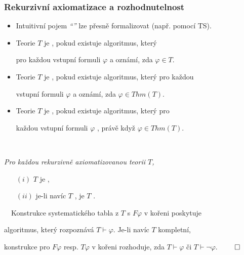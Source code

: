 \subsubsection*{Rekurzivní axiomatizace a rozhodnutelnost}
    \begin{itemize}
    \item Intuitivní pojem \emph{``''} lze přesně formalizovat (např. pomocí TS).
    \smallskip
    
    \item Teorie $T$ je , pokud existuje algoritmus, který
    \smallskip
    
    pro každou vstupní formuli $\varphi$  a oznámí, zda $\varphi \in T$.
    \smallskip
    
    \item Teorie $T$ je , pokud existuje algoritmus, který pro každou
    \smallskip
    
    vstupní formuli $\varphi$  a oznámí, zda $\varphi \in Thm(T)$.
    \smallskip
    
    \item Teorie $T$ je , pokud existuje algoritmus, který pro
    \smallskip
    
    každou vstupní formuli $\varphi$ , právě když $\varphi \in Thm(T)$.
    \end{itemize}
    \smallskip
    
    {\bf {}}\ \ {\it Pro každou rekurzivně axiomatizovanou teorii $T$,

    \begin{enumerate}
    \item [$(i)$] $T$ je ,
    \smallskip
    
    \item [$(ii)$] je-li navíc $T$ , je $T$ .
    \end{enumerate}}
    \smallskip
    
    {\it {}}\ \ Konstrukce systematického tabla z $T$ s $F\varphi$ v kořeni poskytuje
    \smallskip
    
    algoritmus, který rozpoznává $T\vdash\varphi$. Je-li navíc $T$ kompletní, 
    \smallskip
    
    konstrukce pro $F\varphi$ resp. $T\varphi$ v kořeni rozhoduje, zda $T \vdash \varphi$ či $T \vdash \neg\varphi$. $\qed$
    
